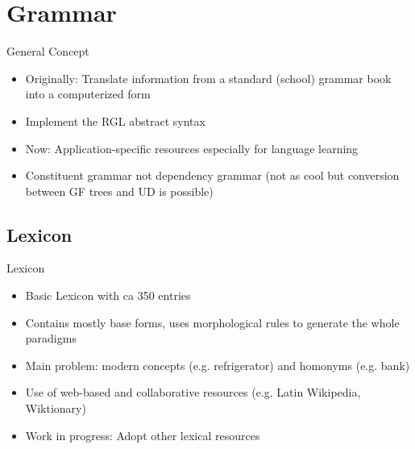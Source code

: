 \documentclass[compress,table]{beamer} %
\begin{document}
\section{Grammar}

\begin{frame}{General Concept}
  \begin{itemize}
  \item Originally: Translate information from a standard (school) grammar book into a computerized form
  \item Implement the RGL abstract syntax
  \item Now: Application-specific resources especially for language learning
  \item Constituent grammar not dependency grammar (not as cool but conversion between GF trees and UD is possible)
  \end{itemize}
\end{frame}
\subsection{Lexicon}
\begin{frame}{Lexicon}
  \begin{itemize}
  \item Basic Lexicon with ca 350 entries
  \item Contains mostly base forms, uses morphological rules to generate the whole paradigms
  \item Main problem: modern concepts (e.g. refrigerator) and homonyms (e.g. bank)
  \item Use of web-based and collaborative resources (e.g. Latin Wikipedia, Wiktionary)
  \item Work in progress: Adopt other lexical resources
  \end{itemize}
\end{frame}
\end{document}
